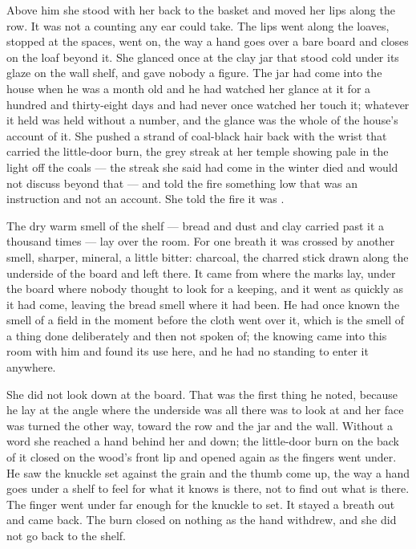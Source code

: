 Above him she stood with her back to the basket and moved her lips along the row. It was not a counting any ear could take. The lips went along the loaves, stopped at the spaces, went on, the way a hand goes over a bare board and closes on the loaf beyond it. She glanced once at the clay jar that stood cold under its glaze on the wall shelf, and gave nobody a figure. The jar had come into the house when he was a month old and he had watched her glance at it for a hundred and thirty-eight days and had never once watched her touch it; whatever it held was held without a number, and the glance was the whole of the house's account of it. She pushed a strand of coal-black hair back with the wrist that carried the little-door burn, the grey streak at her temple showing pale in the light off the coals --- the streak she said had come in the winter  died and would not discuss beyond that --- and told the fire something low that was an instruction and not an account. She told the fire it was .

The dry warm smell of the shelf --- bread and dust and clay carried past it a thousand times --- lay over the room. For one breath it was crossed by another smell, sharper, mineral, a little bitter: charcoal, the charred stick drawn along the underside of the board and left there. It came from where the marks lay, under the board where nobody thought to look for a keeping, and it went as quickly as it had come, leaving the bread smell where it had been. He had once known the smell of a field in the moment before the cloth went over it, which is the smell of a thing done deliberately and then not spoken of; the knowing came into this room with him and found its use here, and he had no standing to enter it anywhere.

She did not look down at the board. That was the first thing he noted, because he lay at the angle where the underside was all there was to look at and her face was turned the other way, toward the row and the jar and the wall. Without a word she reached a hand behind her and down; the little-door burn on the back of it closed on the wood's front lip and opened again as the fingers went under. He saw the knuckle set against the grain and the thumb come up, the way a hand goes under a shelf to feel for what it knows is there, not to find out what is there. The finger went under far enough for the knuckle to set. It stayed a breath out and came back. The burn closed on nothing as the hand withdrew, and she did not go back to the shelf.


